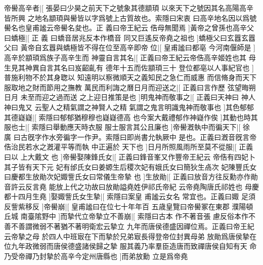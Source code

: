 帝嚳高辛者|[%
張晏曰少昊之前天下之號象其德顓頊%
以來天下之號因其名高陽高辛皆所興%
%
之地名顓頊與嚳皆以字爲號上古質故也。索隱曰宋衷%
曰高辛地名因以爲號嚳名也皇甫謐云帝嚳名夋也。正%
%
義曰帝王紀云%
俈母無聞焉%
]黃帝之曾孫也高辛父曰蟜極|[%
正%
義%
%
曰蟜音居兆反本作橋音%
同又巨遙反帝堯之祖也%
]蟜極父曰玄囂玄囂父曰%
%
黃帝自玄囂與蟜極皆不得在位至高辛即帝%
%
位|[%
皇甫謐曰都亳%
今河南偃師是%
]高辛於顓頊爲族子高辛生而%
%
神靈自言其名|[%
正義曰帝王紀云帝俈高辛姬姓也其%
母生見其神異自言其名曰岌齠齓有%
%
德年十五而佐顓頊三十%
登位都亳以人事紀官也%
]普施利物不於其身聦以%
%
知遠明以察微順天之義知民之急仁而威惠%
%
而信脩身而天下服取地之財而節用之撫教%
%
萬民而利誨之曆日月而迎送之|[%
正義曰言作歷%
弦望晦朔日月%
%
未至而迎之過而送%
之上迎日推策是也%
]明鬼神而敬事之|[%
正義曰天神曰%
神人神曰鬼又%
%
云聖人之精氣謂之神賢人之精%
氣謂之鬼言明識鬼神而敬事也%
]其色郁郁其德嶷嶷|[%
%
索隱曰郁郁猶穆穆也嶷嶷德高%
也今案大戴禮郁作神嶷作俟%
]其動也時其服也士|[%
%
索隱曰舉動應天時衣服%
服士服言其公且廉也%
]帝嚳漑執中而徧天下|[%
徐%
廣%
%
曰古旣字作水旁徧字一作尹。索隱曰即尚書允執厥中%
是也。正義曰漑音旣言帝俈治民若水之漑灌平等而執%
%
中正遍於%
天下也%
]日月所照風雨所至莫不從服|[%
正義曰以%
上大戴文%
%
也%
]帝嚳娶陳鋒氏女|[%
正義曰鋒音峯又作豐帝王紀云%
帝俈有四妃卜其子皆有天下元%
%
妃有邰氏女曰姜嫄生后稷次妃有娥氏女曰簡狄生卨次%
妃陳豐氏女曰慶都生放勛次妃娵訾氏女曰常儀生帝摯%
%
也%
]生放勛|[%
正義曰放音方往反勳亦作勛音許云反言堯%
能放上代之功故曰放勛謚堯姓伊祁氏帝紀%
%
云帝堯陶唐氏祁姓也%
母慶都十四月生堯%
]娶娵訾氏女生摯|[%
索隱曰案皇%
甫謐云女名%
%
常宜也。正義曰娵%
足須反訾紫移反%
]帝嚳崩|[%
皇甫謐曰在位七十年年百%
五歳皇覽曰帝嚳冢在東郡%
%
濮陽頓丘城%
南臺隂野中%
]而摯代立帝摯立不善崩|[%
索隱曰古本%
作不著音張%
%
慮反俗本作不善不善謂微弱不著猶不著明衛宏云摯立%
九年而唐侯德盛因禪位焉。正義曰帝王紀云帝摯之母%
%
於四人中班㝡在下而摯於兄弟㝡長得登帝位封異母弟%
放勛爲唐侯摯在位九年政微弱而唐侯德盛諸侯歸之摯%
%
服其義乃率羣臣造唐而致禪唐侯自知有天%
命乃受帝禪乃封摯於高辛今定州唐縣也%
]而弟放勳%
%
立是爲帝堯%
